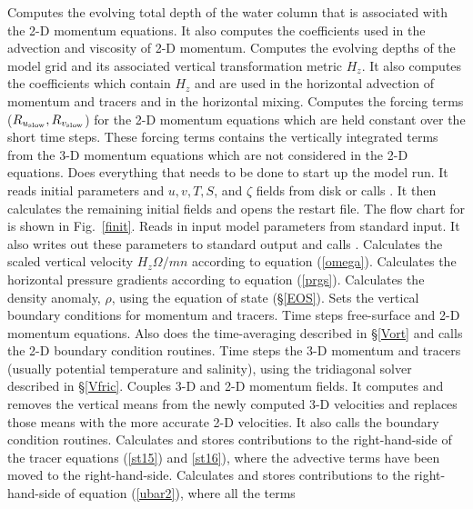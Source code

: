 \begin{klist}
    Computes the  evolving total depth of the water
column that is associated with the 2-D momentum equations. It
also computes the  coefficients  used in the  advection  and
viscosity of 2-D momentum.
    Computes the evolving depths of the model grid and
its associated vertical transformation metric $H_z$. It also computes
the coefficients which contain $H_z$ and are used in the  horizontal
advection of momentum and tracers and in the horizontal mixing.
   Computes the forcing terms
($R_{u_{\rm slow}},R_{v_{\rm slow}}$) for the 2-D momentum
equations which are
held constant over the short time steps.  These forcing terms
contains the vertically integrated  terms  from the  3-D momentum
equations which are not considered in the 2-D equations.
       Does everything that needs to be done to start up
the model run.  It reads initial parameters and $u, v, T, S$, and
$\zeta$ fields from disk or calls .  It then
calculates the remaining initial fields and opens the restart file.
The flow chart for  is shown in Fig.\ \ref{finit}.
     Reads in input model parameters from standard
input.  It also writes out these parameters to standard output and
calls .
     Calculates the scaled vertical velocity
$H_z \Omega/mn$ according to equation (\ref{omega}).
     Calculates the horizontal pressure gradients
according to equation (\ref{prgs}).
     Calculates the density anomaly, $\rho$, using the
equation of state (\S\ref{EOS}).
   Sets the vertical boundary conditions
for momentum and tracers.
    Time steps free-surface and 2-D momentum
equations.  Also does the time-averaging described in \S\ref{Vort} and
calls the 2-D boundary condition routines.
    Time steps the 3-D momentum and tracers
(usually potential temperature and salinity),
using the tridiagonal solver described in \S\ref{Vfric}.
Couples 3-D and 2-D momentum fields. It computes and
removes the vertical means from the newly computed 3-D
velocities and replaces those means with the more accurate 2-D
velocities. It also calls the boundary condition routines.
     Calculates and stores contributions to the
right-hand-side of the tracer equations (\ref{st15}) and \ref{st16}),
where the advective terms have been moved to the right-hand-side.
       Calculates and stores contributions
to the right-hand-side of equation (\ref{ubar2}), where all the terms

\end{klist}

